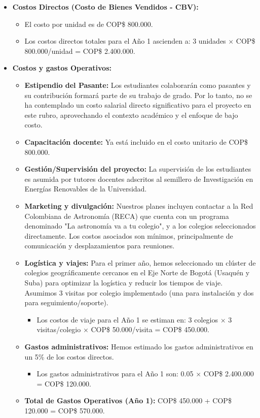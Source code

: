 \begin{itemize}
    \item \textbf{Costos Directos (Costo de Bienes Vendidos - CBV):}
    \begin{itemize}
        \item El costo por unidad es de COP\$ 800.000.
        \item Los costos directos totales para el Año 1 ascienden a: 
					3 unidades $\times$ COP\$ 800.000/unidad = COP\$ 2.400.000.
    \end{itemize}
    \item \textbf{Costos y gastos Operativos:}
    \begin{itemize}
        \item \textbf{Estipendio del Pasante:} Los estudiantes colaborarán como 
					pasantes y su contribución formará parte de su trabajo de grado. Por 
					lo tanto, no se ha contemplado un costo salarial directo 
					significativo para el proyecto en este rubro, aprovechando el 
					contexto académico y el enfoque de bajo costo.
        \item \textbf{Capacitación docente:} Ya está incluido en el costo 
					unitario de COP\$ 800.000.
        \item \textbf{Gestión/Supervisión del proyecto:} La supervisión de los 
					estudiantes es asumida por tutores docentes adscritos al semillero de 
					Investigación en Energías Renovables de la Universidad.
        \item \textbf{Marketing y divulgación:} Nuestros planes incluyen 
					contactar a la Red Colombiana de Astronomía (RECA) que cuenta con un 
					programa denominado "La astronomía va a tu colegio", y a los colegios 
					seleccionados directamente. Los costos asociados son mínimos, 
					principalmente de comunicación y desplazamientos para reuniones.
        \item \textbf{Logística y viajes:} Para el primer año, hemos 
					seleccionado un clúster de colegios geográficamente cercanos en el 
					Eje Norte de Bogotá (Usaquén y Suba) para optimizar la logística y 
					reducir los tiempos de viaje. Asumimos 3 visitas por colegio 
					implementado (una para instalación y dos para seguimiento/soporte).
        \begin{itemize}
            \item Los costos de viaje para el Año 1 se estiman en: 
							3 colegios $\times$ 3 visitas/colegio $\times$ 
							COP\$ 50.000/visita = COP\$ 450.000.
        \end{itemize}
        \item \textbf{Gastos administrativos:} Hemos estimado los gastos 
					administrativos en un 5\% de los costos directos.
        \begin{itemize}
            \item Los gastos administrativos para el Año 1 son: 
							0.05 $\times$ COP\$ 2.400.000 = COP\$ 120.000.
        \end{itemize}
        \item \textbf{Total de Gastos Operativos (Año 1):} 
					COP\$ 450.000 + COP\$ 120.000 = COP\$ 570.000.
    \end{itemize}
\end{itemize}


